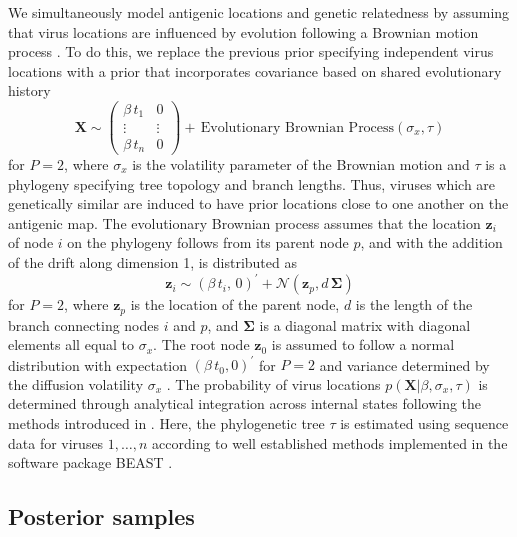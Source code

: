 \documentclass[11pt,oneside,letterpaper]{article}
\newcommand{\viruses}{\mathbf{X}}					%
\newcommand{\virussd}{\sigma_x}						%
\newcommand{\tree}{\tau}							%
\newcommand{\vn}{n}									%
\newcommand{\node}{\mathbf{z}}						%
\newcommand{\normal}{\mathcal{N}}					%
\begin{document}
We simultaneously model antigenic locations and genetic relatedness by assuming that virus locations are influenced by evolution following a Brownian motion process \cite{Lemey10}.
To do this, we replace the previous prior specifying independent virus locations with a prior that incorporates covariance based on shared evolutionary history
\begin{equation}
	\viruses \sim \left( \begin{matrix} \beta \, t_1 & 0 \\ \vdots & \vdots \\ \beta \, t_n & 0 \end{matrix} \right) + \, \mbox{Evolutionary Brownian Process}(\virussd, \tree)
\end{equation}
for $P=2$, where $\virussd$ is the volatility parameter of the Brownian motion and $\tree$ is a phylogeny specifying tree topology and branch lengths.
Thus, viruses which are genetically similar are induced to have prior locations close to one another on the antigenic map.
The evolutionary Brownian process assumes that the location $\node_i$ of node $i$ on the phylogeny follows from its parent node $p$, and with the addition of the drift along dimension 1, is distributed as
\begin{equation}
	\node_i \sim (\beta \, t_i, \, 0)^{\prime} + \normal(\node_p, d \, \boldsymbol{\Sigma})
\end{equation}
for $P=2$, where $\node_p$ is the location of the parent node, $d$ is the length of the branch connecting nodes $i$ and $p$, and $\boldsymbol{\Sigma}$ is a diagonal matrix with diagonal elements all equal to $\virussd$.
The root node $\node_0$ is assumed to follow a normal distribution with expectation $(\beta \, t_0, 0)^{\prime}$ for $P=2$ and variance determined by the diffusion volatility $\virussd$ \cite{Lemey10}.
The probability of virus locations $p(\viruses | \beta, \virussd, \tree)$ is determined through analytical integration across internal states following the methods introduced in \cite{Lemey10}.
Here, the phylogenetic tree $\tree$ is estimated using sequence data for viruses $1,\ldots,\vn$ according to well established methods implemented in the software package BEAST \cite{BEAST, BEAST17}.

\subsection*{Posterior samples}
\end{document}
